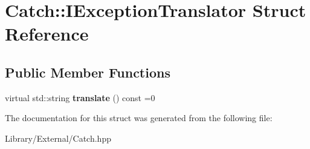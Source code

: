 \hypertarget{struct_catch_1_1_i_exception_translator}{}\section{Catch\+:\+:I\+Exception\+Translator Struct Reference}
\label{struct_catch_1_1_i_exception_translator}
\subsection*{Public Member Functions}
\begin{DoxyCompactItemize}
\item 
\hypertarget{struct_catch_1_1_i_exception_translator_ade89aa305d8c89576521e76b2d1f82eb}{}virtual std\+::string {\bfseries translate} () const =0\label{struct_catch_1_1_i_exception_translator_ade89aa305d8c89576521e76b2d1f82eb}

\end{DoxyCompactItemize}


The documentation for this struct was generated from the following file\+:\begin{DoxyCompactItemize}
\item 
Library/\+External/Catch.\+hpp\end{DoxyCompactItemize}
